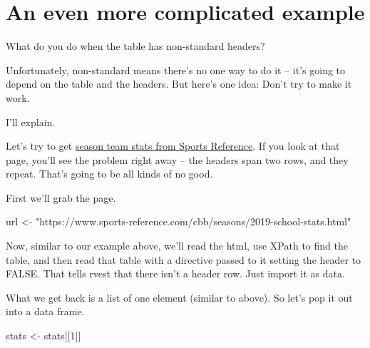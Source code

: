 \documentclass[]{book}
\newenvironment{Shaded}{\begin{snugshade}}{\end{snugshade}}
\newcommand{\KeywordTok}[1]{\textcolor[rgb]{0.13,0.29,0.53}{\textbf{#1}}}
\newcommand{\DataTypeTok}[1]{\textcolor[rgb]{0.13,0.29,0.53}{#1}}
\newcommand{\DecValTok}[1]{\textcolor[rgb]{0.00,0.00,0.81}{#1}}
\newcommand{\StringTok}[1]{\textcolor[rgb]{0.31,0.60,0.02}{#1}}
\newcommand{\OtherTok}[1]{\textcolor[rgb]{0.56,0.35,0.01}{#1}}
\newcommand{\OperatorTok}[1]{\textcolor[rgb]{0.81,0.36,0.00}{\textbf{#1}}}
\newcommand{\NormalTok}[1]{#1}
\begin{document}
\section{An even more complicated
example}\label{an-even-more-complicated-example}

What do you do when the table has non-standard headers?

Unfortunately, non-standard means there's no one way to do it -- it's
going to depend on the table and the headers. But here's one idea: Don't
try to make it work.

I'll explain.

Let's try to get
\href{https://www.sports-reference.com/cbb/seasons/2019-school-stats.html}{season
team stats from Sports Reference}. If you look at that page, you'll see
the problem right away -- the headers span two rows, and they repeat.
That's going to be all kinds of no good.

First we'll grab the page.

\begin{Shaded}
\begin{Highlighting}[]
\NormalTok{url <-}\StringTok{ "https://www.sports-reference.com/cbb/seasons/2019-school-stats.html"}
\end{Highlighting}
\end{Shaded}

Now, similar to our example above, we'll read the html, use XPath to
find the table, and then read that table with a directive passed to it
setting the header to FALSE. That tells rvest that there isn't a header
row. Just import it as data.

\begin{Shaded}
\end{Shaded}

What we get back is a list of one element (similar to above). So let's
pop it out into a data frame.

\begin{Shaded}
\begin{Highlighting}[]
\NormalTok{stats <-}\StringTok{ }\NormalTok{stats[[}\DecValTok{1}\NormalTok{]]}
\end{Highlighting}
\end{Shaded}
\end{document}
